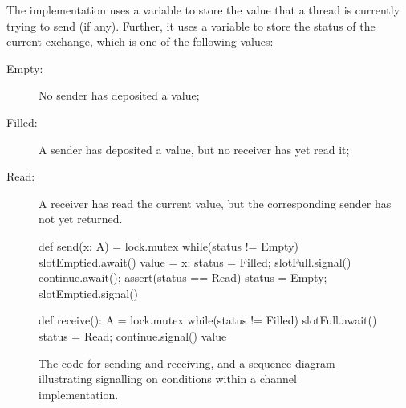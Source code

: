 The implementation uses a variable  to store the value that a
thread is currently trying to send (if any).  Further, it uses a variable
 to store the status of the current exchange, which is one of
the following values:
%
\begin{description}
\item[{\scalastyle Empty}:] No sender has deposited a value;
\item[{\scalastyle Filled}:] A sender has deposited a value, but no receiver
  has yet read it;
\item[{\scalastyle Read}:] A receiver has read the current value, but the
  corresponding sender has not yet returned.
\end{description}
%


\begin{figure}
\begin{minipage}[t]{80mm}
\begin{scala}
def send(x: A) = lock.mutex{
  while(status != Empty) slotEmptied.await()
  value = x; status = Filled; slotFull.signal()
  continue.await(); assert(status == Read)
  status = Empty; slotEmptied.signal()
}
\end{scala}
\end{minipage}
%
\begin{minipage}[t]{75mm}
\begin{scala}
def receive(): A = lock.mutex{
  while(status != Filled) slotFull.await()
  status = Read; continue.signal()
  value
}
\end{scala}
\end{minipage}


\begin{center}
\def\rx{3} %
\def\height{4}  %
\def\delta{0.8} %
\end{center}
\caption{The code for sending and receiving, and a sequence diagram
  illustrating signalling on conditions within a channel
  implementation. 
\label{fig:channel-sd}}\label{fig:basic-channel-scala}
\end{figure}

